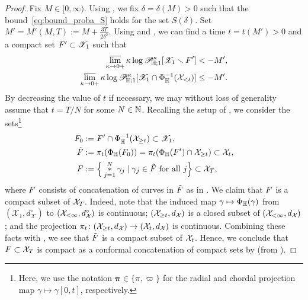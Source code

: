 \documentclass[a4paper, 11pt]{article}
\theoremstyle{definition}
\numberwithin{equation}{section}
\numberwithin{figure}{section}
\renewcommand{\limsup}{\varlimsup}
\newcommand{\prXpaths}[1]{\boldsymbol{\pi}_{#1}}
\newcommand{\prDpaths}[1]{\pi_{#1}}
\newcommand{\prHpaths}[1]{\varpi_{#1}}
\newcommand{\concat}{*}
\newcommand{\Dpaths}[1][]{\cX_{#1}}
\newcommand{\Hpaths}[1][]{\mathscr{X}_{#1}} %
\newcommand{\dDpaths}[1][]{d_{\Dpaths[#1]}}
\newcommand{\dHpathsUnparam}{d_{\!\Hpaths}^\circ}%
\newcommand{\dDpathsUnparam}{d_{\Dpaths}^\circ}%
\newcommand{\cHmeasure}[2][]{\mathscr{P}^{#2}_{\!\bH;#1}}
\newcommand{\cond}{\;|\;}
\begin{document}
\begin{proof}
Fix $M \in [0,\infty)$. 
Using , 
we fix $\delta = \delta(M) > 0$ such that the bound~\eqref{eq:bound_proba_S} holds for the set $S(\delta)$.
Set $M' = M'(M,T) := M+\frac{3T}{2\delta^2}$. 
Using  and , 
we can find a time $t = t(M') > 0$ and a compact set $\compact' \subset \Hpaths[1]$ such that
\begin{align} \label{eq:bound_proba_chord}
\begin{split}
\limsup_{\kappa \to 0+}\kappa\log\cHmeasure[1]{\kappa}[\Hpaths[1] \smallsetminus \compact'] < -M' ,
\\
\limsup_{\kappa \to 0+}\kappa\log\cHmeasure[1]{\kappa}[\Hpaths[1] \cap \Phi_\bH^{-1}(\Dpaths[<t])] \le -M' .
\end{split}
\end{align}
By decreasing the value of $t$ if necessary, we may without loss of generality assume 
that $t = T/N$ for some $N \in \mathbb{N}$. 
Recalling the setup of , 
we consider the sets\footnote{\label{fn:proj}Here, we use the notation $\prXpaths{} \in \{\prDpaths{}, \prHpaths{}\}$ for the radial and chordal projection map $\gamma \mapsto \gamma[0,t]$, respectively.}
\begin{align*}
\compact_0 :=\; & \compact' \cap \Phi_\bH^{-1}(\Dpaths[\ge t]) \subset \Hpaths[1], 
\\
\tilde{\compact} := \;& \prDpaths{t}(\Phi_\bH(\compact_0)) = \prDpaths{t}(\Phi_\bH(\compact') \cap \Dpaths[\ge t]) \subset \Dpaths[t], 
 \\
\compact :=  \; & \Big\{\overset{N}{\underset{j=1}{\concat}} \gamma_j \cond \gamma_j \in \tilde{\compact} \textnormal{ for all } j\Big\} \subset \Dpaths[T] ,
\end{align*}
where $F$ consists of concatenation of curves in $\tilde{F}$ as in .
We claim that $F$ is a compact subset of $\Dpaths[T]$. 
Indeed, note that the induced map $\gamma \mapsto \Phi_{\mathbb{H}}(\gamma)$ 
from $(\Hpaths[1],\dHpathsUnparam)$ to $(\Dpaths[<\infty],\dDpathsUnparam)$ is continuous; 
$(\Dpaths[\ge t],\dDpaths)$ is a closed subset of $(\Dpaths[<\infty],\dDpaths)$;
and the projection $\prDpaths{t} \colon (\Dpaths[\ge t],\dDpaths) \to (\Dpaths[t],\dDpaths)$ is continuous.
Combining these facts with , 
we see that $\tilde{F}$ is a compact subset of $\Dpaths[t]$. 
Hence, we conclude that $\compact \subset \Dpaths[T]$ is compact as a conformal concatenation of compact sets by  (from ).



\end{proof}
\end{document}
